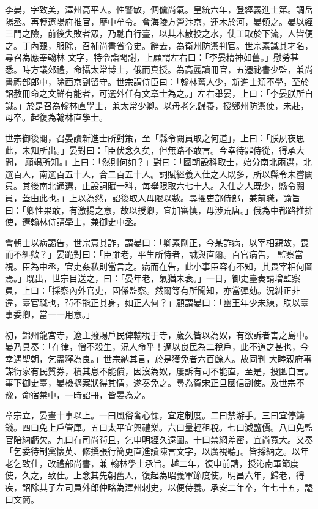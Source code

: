 \begin{pinyinscope}
 李晏，字致美，澤州高平人。性警敏，倜儻尚氣。皇統六年，登經義進士第。調岳陽丞。再轉遼陽府推官，歷中牟令。會海陵方營汴京，運木於河，晏領之。晏以經三門之險，前後失敗者眾，乃馳白行臺，以其木散投之水，使工取於下流，人皆便之。丁內艱，服除，召補尚書省令史。辭去，為衛州防禦判官。世宗素識其才名，尋召為應奉翰林
 文字，特令詣閣謝，上顧謂左右曰：「李晏精神如舊。」慰勞甚悉。時方議郊禮，命攝太常博士，俄而真授。為高麗讀冊官，五遷祕書少監，兼尚書禮部郎中，除西京副留守。世宗謂侍臣曰：「翰林舊人少，新進士類不學，至於詔赦冊命之文鮮有能者，可選外任有文章士為之。」左右舉晏，上曰：「李晏朕所自識。」於是召為翰林直學士，兼太常少卿。以母老乞歸養，授鄭州防禦使，未赴，母卒。起復為翰林直學士。



 世宗御後閣，召晏讀新進士所對策，至「縣令闕員取之何道」，上曰：「朕夙夜思此，未知所出。」晏對曰：「臣伏念久矣，但無路不敢言。今幸待罪侍從，得承大問，
 願竭所知。」上曰：「然則何如？」對曰：「國朝設科取士，始分南北兩選，北選百人，南選百五十人，合二百五十人。詞賦經義入仕之人既多，所以縣令未嘗闕員。其後南北通選，止設詞賦一科，每舉限取六七十人。入仕之人既少，縣令闕員，蓋由此也。」上以為然，詔後取人毋限以數。尋擢吏部侍郎，兼前職，諭旨曰：「卿性果敢，有激揚之意，故以授卿，宜加審慎，毋涉荒唐。」俄為中都路推排使，遷翰林侍講學士，兼御史中丞。



 會朝士以病謁告，世宗意其詐，謂晏曰：「卿素剛正，今某詐病，以宰相親故，畏而不糾歟？」晏跪對曰：「臣雖老，平生所恃者，誠與直爾。百官病告，
 監察當視。臣為中丞，官吏姦私則當言之。病而在告，此小事臣容有不知，其畏宰相何圖焉。」既出，世宗目送之，曰：「晏年老，氣猶未衰。」一日，御史臺奏請增監察員，上曰：「採察內外官吏，固係監察。然爾等有所聞知，亦當彈劾。況糾正非違，臺官職也，茍不能正其身，如正人何？」顧謂晏曰：「豳王年少未練，朕以臺事委卿，當一一用意。」



 初，錦州龍宮寺，遼主撥賜戶民俾輸稅于寺，歲久皆以為奴，有欲訴者害之島中。晏乃具奏：「在律，僧不殺生，況人命乎！遼以良民為二稅戶，此不道之甚也，今幸遇聖朝，乞盡釋為良。」世宗納其言，於是獲免者六百餘人。故同判
 大睦親府事謀衍家有民質券，積其息不能償，因沒為奴，屢訴有司不能直，至是，投匭自言。事下御史臺，晏檢擿案狀得其情，遂奏免之。尋為賀宋正旦國信副使。及世宗不豫，命宿禁中，一時詔冊，皆晏為之。



 章宗立，晏畫十事以上。一曰風俗奢心慄，宜定制度。二曰禁游手。三曰宜停鑄錢。四曰免上戶管庫。五曰太平宜興禮樂。六曰量輕租稅。七曰減鹽價。八曰免監官陪納虧欠。九曰有司尚茍且，乞申明經久遠圖。十曰禁網差密，宜尚寬大。又奏「乞委待制黨懷英、修撰張行簡更直進讀陳言文字，以廣視聽」。皆採納之。以年老乞致仕，改禮部尚書，兼
 翰林學士承旨。越二年，復申前請，授沁南軍節度使，久之，致仕。上念其先朝舊人，復起為昭義軍節度使。明昌六年，歸老，得疾，詔除其子左司員外郎仲略為澤州刺史，以便侍養。承安二年卒，年七十五，謚曰文簡。




\end{pinyinscope}
